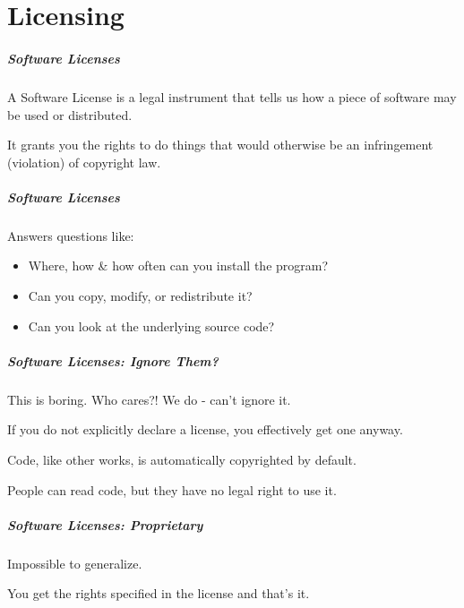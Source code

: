 \part{Licensing}
\frame{\partpage}

\begin{frame}
\frametitle{Software Licenses}

\begin{changemargin}{1cm}
A \alert{Software License} is a legal instrument that tells us how a piece of software may be used or distributed.

It grants you the rights to do things that would otherwise be an infringement (violation) of copyright law.


\end{changemargin}
\end{frame}

\begin{frame}
\frametitle{Software Licenses}

\begin{changemargin}{1cm}

Answers questions like:

\begin{itemize}
	\item Where, how \& how often can you install the program?
	\item Can you copy, modify, or redistribute it?
	\item Can you look at the underlying source code?
\end{itemize}

\end{changemargin}
\end{frame}


\begin{frame}
\frametitle{Software Licenses: Ignore Them?}

\begin{changemargin}{1cm}

This is boring. Who cares?! We do - can't ignore it.

If you do not explicitly declare a license, you effectively get one anyway. 

Code, like other works, is automatically copyrighted by default.

People can read code, but they have no legal right to use it.
\end{changemargin}
\end{frame}

\begin{frame}
\frametitle{Software Licenses: Proprietary}

\begin{changemargin}{1cm}
Impossible to generalize.

You get the rights specified in the license and that's it.

\end{changemargin}
\end{frame}

